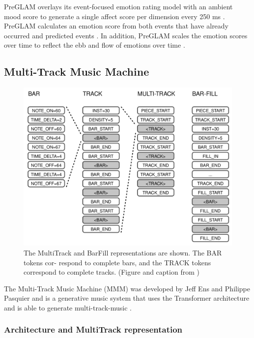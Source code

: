 PreGLAM overlays its event-focused emotion rating model with an ambient mood score to generate a single affect score per dimension every 250 ms \cite{plut2023preglam}. PreGLAM calculates an emotion score from both events that have already occurred and predicted events \cite{plut2023preglam}. In addition, PreGLAM scales the emotion scores over time to reflect the ebb and flow of emotions over time \cite{plut2023preglam}.



\subsection{Multi-Track Music Machine}

\begin{figure}[h]
    \centering
    \includegraphics[width=\linewidth]{images/bar_fill_multi_track.png}
    \caption{The MultiTrack and BarFill representations are shown. The BAR tokens cor-
respond to complete bars, and the TRACK tokens correspond to complete tracks. (Figure and caption from \cite{ens2020mmm})}
    \label{fig:multi_track_figure}
\end{figure}

The Multi-Track Music Machine (MMM) was developed by Jeff Ens and Philippe Pasquier and is a generative music system that uses the Transformer architecture \cite{vaswani2017transformer} and is able to generate multi-track-music \cite{ens2020mmm}.

\subsubsection{Architecture and MultiTrack representation}

